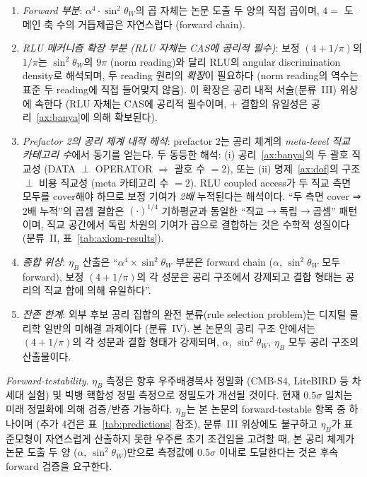\documentclass[entropy,article,submit,pdftex,oneauthor]{Definitions/mdpi}
\begin{document}
\begin{enumerate}
\item \emph{Forward 부분}: $\alpha^4 \cdot \sin^2\theta_W$의 곱 자체는 논문 도출 두 양의 직접 곱이며, $4 = $ 도메인 축 수의 거듭제곱은 자연스럽다 (forward chain).

\item \emph{RLU 메커니즘 확장 부분 (RLU 자체는 CAS에 공리적 필수)}: 보정 $(4 + 1/\pi)$의 $1/\pi$는 $\sin^2\theta_W$의 $9\pi$ (norm reading)와 달리 RLU의 angular discrimination density로 해석되며, 두 reading 원리의 \emph{확장}이 필요하다 (norm reading의 역수는 표준 두 reading에 직접 들어맞지 않음). 이 확장은 공리 내적 서술(분류~III) 위상에 속한다 (RLU 자체는 CAS에 공리적 필수이며, $+$ 결합의 유일성은 공리~\ref{ax:banya}에 의해 확보된다).

\item \emph{Prefactor 2의 공리 체계 내적 해석}: prefactor $2$는 공리 체계의 \emph{meta-level 직교 카테고리 수}에서 동기를 얻는다. 두 동등한 해석: (i) 공리~\ref{ax:banya}의 두 괄호 직교성 (DATA $\perp$ OPERATOR $\Rightarrow$ 괄호 수 $= 2$), 또는 (ii) 명제~\ref{ax:dof}의 구조 $\perp$ 비용 직교성 (meta 카테고리 수 $= 2$). RLU coupled access가 두 직교 측면 모두를 cover해야 하므로 보정 기여가 \emph{2배} 누적된다는 해석이다. ``두 측면 cover ⇒ 2배 누적''의 곱셈 결합은 $(\cdot)^{1/4}$ 기하평균과 동일한 ``직교$\to$독립$\to$곱셈'' 패턴이며, 직교 공간에서 독립 차원의 기여가 곱으로 결합하는 것은 수학적 성질이다 (분류~II, 표~\ref{tab:axiom-results}).

\item \emph{종합 위상}: $\eta_B$ 산출은 ``$\alpha^4 \times \sin^2\theta_W$ 부분은 forward chain ($\alpha$, $\sin^2\theta_W$ 모두 forward), 보정 $(4 + 1/\pi)$의 각 성분은 공리 구조에서 강제되고 결합 형태는 공리의 직교 합에 의해 유일하다''.

\item \emph{잔존 한계}: 외부 후보 공리 집합의 완전 분류(rule selection problem)는 디지털 물리학 일반의 미해결 과제이다 (분류~IV). 본 논문의 공리 구조 안에서는 $(4+1/\pi)$의 각 성분과 결합 형태가 강제되며, $\alpha$, $\sin^2\theta_W$, $\eta_B$ 모두 공리 구조의 산출물이다.
\end{enumerate}

\emph{Forward-testability}. $\eta_B$ 측정은 향후 우주배경복사 정밀화 (CMB-S4, LiteBIRD 등 차세대 실험) 및 빅뱅 핵합성 정밀 측정으로 정밀도가 개선될 것이다. 현재 $0.5\sigma$ 일치는 미래 정밀화에 의해 검증/반증 가능하다. $\eta_B$는 본 논문의 forward-testable 항목 중 하나이며 (추가 4건은 표~\ref{tab:predictions} 참조), 분류~III 위상에도 불구하고 $\eta_B$가 표준모형이 자연스럽게 산출하지 못한 우주론 초기 조건임을 고려할 때, 본 공리 체계가 논문 도출 두 양 ($\alpha$, $\sin^2\theta_W$)만으로 측정값에 $0.5\sigma$ 이내로 도달한다는 것은 후속 forward 검증을 요구한다.
\end{document}
